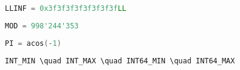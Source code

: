 \begin{lstlisting}[language=C++]
LLINF = 0x3f3f3f3f3f3f3f3fLL
\end{lstlisting}

\begin{lstlisting}[language=C++]
MOD = 998'244'353
\end{lstlisting}

\begin{lstlisting}[language=C++]
PI = acos(-1)
\end{lstlisting}

\begin{lstlisting}[language=C++]
  INT_MIN \quad INT_MAX \quad INT64_MIN \quad INT64_MAX
\end{lstlisting}